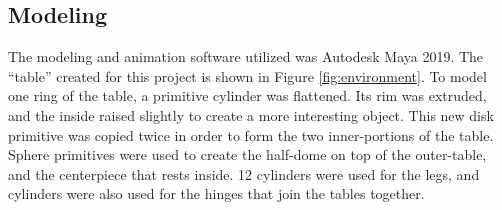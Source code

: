 \documentclass[conference]{IEEEtran}
\begin{document}

\subsection{Modeling}
\label{subsec:modeling}
The modeling and animation software utilized was Autodesk Maya 2019.
The ``table'' created for this project is shown in Figure \ref{fig:environment}.
To model one ring of the table, a primitive cylinder was flattened.
Its rim was extruded, and the inside raised slightly to create a more interesting object.
This new disk primitive was copied twice in order to form the two inner-portions of the table.
Sphere primitives were used to create the half-dome on top of the outer-table, and the centerpiece
that rests inside. 12 cylinders were used for the legs, and cylinders were also used
for the hinges that join the tables together.
\end{document}
